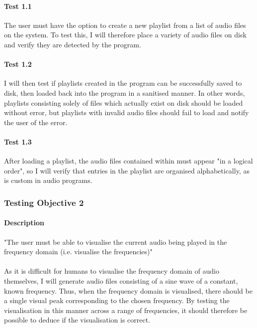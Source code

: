 \paragraph{Test 1.1}
The user must have the option to create a new playlist from a list of audio files on the system.  To test this, I will therefore place a variety of audio files on disk and verify they are detected by the program.

\paragraph{Test 1.2}
I will then test if playlists created in the program can be successfully saved to disk, then loaded back into the program in a sanitised manner. In other words, playlists consisting solely of files which actually exist on disk should be loaded without error, but playlists with invalid audio files should fail to load and notify the user of the error.

\paragraph{Test 1.3}
After loading a playlist, the audio files contained within must appear "in a logical order", so I will verify that entries in the playlist are organised alphabetically, as is custom in audio programs.

\pagebreak
\subsubsection{Testing Objective 2}
\paragraph{Description} "The user must be able to visualise the current audio being played in the frequency domain (i.e. visualise the frequencies)"

\paragraph{}
As it is difficult for humans to visualise the frequency domain of audio themselves, I will generate audio files consisting of a sine wave of a constant, known frequency. Thus, when the frequency domain is visualised, there should be a single visual peak corresponding to the chosen frequency. By testing the visualisation in this manner across a range of frequencies, it should therefore be possible to deduce if the visualisation is correct.

